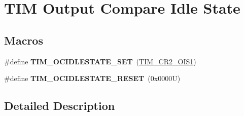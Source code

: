 \hypertarget{group___t_i_m___output___compare___idle___state}{}\section{T\+IM Output Compare Idle State}
\label{group___t_i_m___output___compare___idle___state}
\subsection*{Macros}
\begin{DoxyCompactItemize}
\item 
\mbox{\label{group___t_i_m___output___compare___idle___state_gad251b83b0e33ddd0ed2fb35aa747ef78}} 
\#define {\bfseries T\+I\+M\+\_\+\+O\+C\+I\+D\+L\+E\+S\+T\+A\+T\+E\+\_\+\+S\+ET}~(\hyperlink{group___peripheral___registers___bits___definition_ga31b26bf058f88d771c33aff85ec89358}{T\+I\+M\+\_\+\+C\+R2\+\_\+\+O\+I\+S1})
\item 
\mbox{\label{group___t_i_m___output___compare___idle___state_ga56505fe4142096454f1da97683ce8bc2}} 
\#define {\bfseries T\+I\+M\+\_\+\+O\+C\+I\+D\+L\+E\+S\+T\+A\+T\+E\+\_\+\+R\+E\+S\+ET}~(0x0000\+U)
\end{DoxyCompactItemize}


\subsection{Detailed Description}
